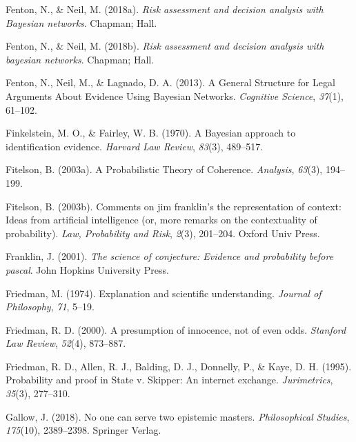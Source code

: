 \documentclass[11pt,dvipsnames,enabledeprecatedfontcommands]{scrartcl}
\begin{document}
\leavevmode\hypertarget{ref-Fenton2018risk}{}%
Fenton, N., \& Neil, M. (2018a). \emph{Risk assessment and decision
analysis with Bayesian networks}. Chapman; Hall.

\leavevmode\hypertarget{ref-Fenton2018Risk}{}%
Fenton, N., \& Neil, M. (2018b). \emph{Risk assessment and decision
analysis with bayesian networks}. Chapman; Hall.

\leavevmode\hypertarget{ref-fenton2013GeneralStructureLegal}{}%
Fenton, N., Neil, M., \& Lagnado, D. A. (2013). A General Structure for
Legal Arguments About Evidence Using Bayesian Networks. \emph{Cognitive
Science}, \emph{37}(1), 61--102.

\leavevmode\hypertarget{ref-Finkelstein1970A}{}%
Finkelstein, M. O., \& Fairley, W. B. (1970). A Bayesian approach to
identification evidence. \emph{Harvard Law Review}, \emph{83}(3),
489--517.

\leavevmode\hypertarget{ref-fitelson2003ProbabilisticTheoryCoherence}{}%
Fitelson, B. (2003a). A Probabilistic Theory of Coherence.
\emph{Analysis}, \emph{63}(3), 194--199.

\leavevmode\hypertarget{ref-fitelson2003comments}{}%
Fitelson, B. (2003b). Comments on jim franklin's the representation of
context: Ideas from artificial intelligence (or, more remarks on the
contextuality of probability). \emph{Law, Probability and Risk},
\emph{2}(3), 201--204. Oxford Univ Press.

\leavevmode\hypertarget{ref-Franklin2001}{}%
Franklin, J. (2001). \emph{The science of conjecture: Evidence and
probability before pascal}. John Hopkins University Press.

\leavevmode\hypertarget{ref-friedman1974}{}%
Friedman, M. (1974). Explanation and scientific understanding.
\emph{Journal of Philosophy}, \emph{71}, 5--19.

\leavevmode\hypertarget{ref-Friedman2000}{}%
Friedman, R. D. (2000). A presumption of innocence, not of even odds.
\emph{Stanford Law Review}, \emph{52}(4), 873--887.

\leavevmode\hypertarget{ref-friedmanEtAl1995}{}%
Friedman, R. D., Allen, R. J., Balding, D. J., Donnelly, P., \& Kaye, D.
H. (1995). Probability and proof in State v. Skipper: An internet
exchange. \emph{Jurimetrics}, \emph{35}(3), 277--310.

\leavevmode\hypertarget{ref-Gallow2018No}{}%
Gallow, J. (2018). No one can serve two epistemic masters.
\emph{Philosophical Studies}, \emph{175}(10), 2389--2398. Springer
Verlag.
\end{document}
